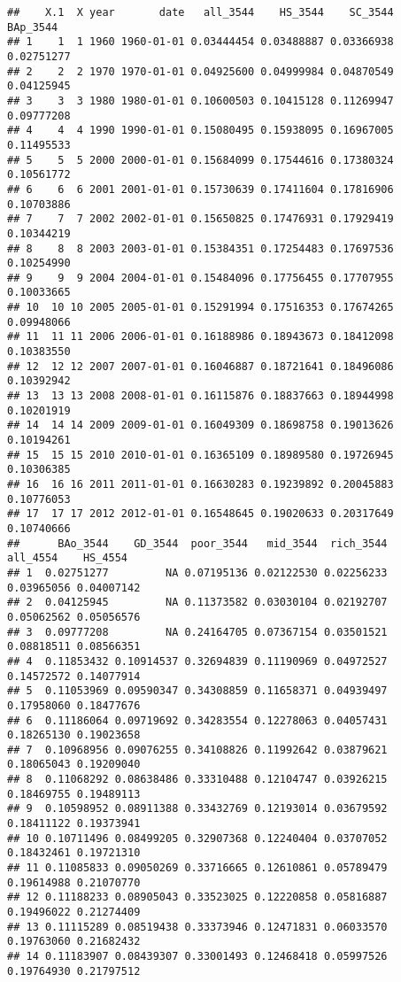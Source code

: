 \documentclass[
]{article}
\begin{document}
\begin{verbatim}
##    X.1  X year       date   all_3544    HS_3544    SC_3544   BAp_3544
## 1    1  1 1960 1960-01-01 0.03444454 0.03488887 0.03366938 0.02751277
## 2    2  2 1970 1970-01-01 0.04925600 0.04999984 0.04870549 0.04125945
## 3    3  3 1980 1980-01-01 0.10600503 0.10415128 0.11269947 0.09777208
## 4    4  4 1990 1990-01-01 0.15080495 0.15938095 0.16967005 0.11495533
## 5    5  5 2000 2000-01-01 0.15684099 0.17544616 0.17380324 0.10561772
## 6    6  6 2001 2001-01-01 0.15730639 0.17411604 0.17816906 0.10703886
## 7    7  7 2002 2002-01-01 0.15650825 0.17476931 0.17929419 0.10344219
## 8    8  8 2003 2003-01-01 0.15384351 0.17254483 0.17697536 0.10254990
## 9    9  9 2004 2004-01-01 0.15484096 0.17756455 0.17707955 0.10033665
## 10  10 10 2005 2005-01-01 0.15291994 0.17516353 0.17674265 0.09948066
## 11  11 11 2006 2006-01-01 0.16188986 0.18943673 0.18412098 0.10383550
## 12  12 12 2007 2007-01-01 0.16046887 0.18721641 0.18496086 0.10392942
## 13  13 13 2008 2008-01-01 0.16115876 0.18837663 0.18944998 0.10201919
## 14  14 14 2009 2009-01-01 0.16049309 0.18698758 0.19013626 0.10194261
## 15  15 15 2010 2010-01-01 0.16365109 0.18989580 0.19726945 0.10306385
## 16  16 16 2011 2011-01-01 0.16630283 0.19239892 0.20045883 0.10776053
## 17  17 17 2012 2012-01-01 0.16548645 0.19020633 0.20317649 0.10740666
##      BAo_3544    GD_3544  poor_3544   mid_3544  rich_3544   all_4554    HS_4554
## 1  0.02751277         NA 0.07195136 0.02122530 0.02256233 0.03965056 0.04007142
## 2  0.04125945         NA 0.11373582 0.03030104 0.02192707 0.05062562 0.05056576
## 3  0.09777208         NA 0.24164705 0.07367154 0.03501521 0.08818511 0.08566351
## 4  0.11853432 0.10914537 0.32694839 0.11190969 0.04972527 0.14572572 0.14077914
## 5  0.11053969 0.09590347 0.34308859 0.11658371 0.04939497 0.17958060 0.18477676
## 6  0.11186064 0.09719692 0.34283554 0.12278063 0.04057431 0.18265130 0.19023658
## 7  0.10968956 0.09076255 0.34108826 0.11992642 0.03879621 0.18065043 0.19209040
## 8  0.11068292 0.08638486 0.33310488 0.12104747 0.03926215 0.18469755 0.19489113
## 9  0.10598952 0.08911388 0.33432769 0.12193014 0.03679592 0.18411122 0.19373941
## 10 0.10711496 0.08499205 0.32907368 0.12240404 0.03707052 0.18432461 0.19721310
## 11 0.11085833 0.09050269 0.33716665 0.12610861 0.05789479 0.19614988 0.21070770
## 12 0.11188233 0.08905043 0.33523025 0.12220858 0.05816887 0.19496022 0.21274409
## 13 0.11115289 0.08519438 0.33373946 0.12471831 0.06033570 0.19763060 0.21682432
## 14 0.11183907 0.08439307 0.33001493 0.12468418 0.05997526 0.19764930 0.21797512

\end{verbatim}
\end{document}
